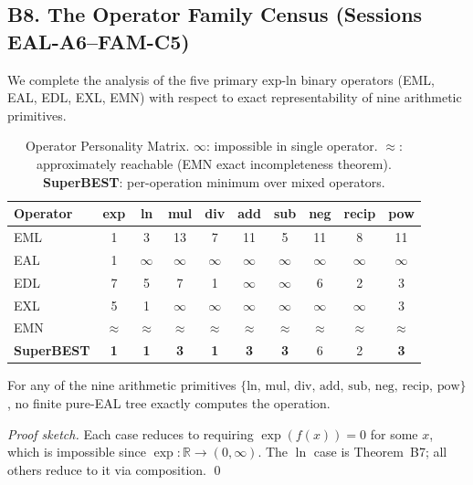 \subsection*{B8. The Operator Family Census (Sessions EAL-A6--FAM-C5)}

We complete the analysis of the five primary exp-ln binary operators
(EML, EAL, EDL, EXL, EMN) with respect to exact representability
of nine arithmetic primitives.

\begin{table}[h]
\centering
\begin{tabular}{l|ccccccccc}
\hline
Operator & exp & ln & mul & div & add & sub & neg & recip & pow \\
\hline
EML      & 1   & 3  & 13  & 7   & 11  & 5   & 11  & 8     & 11  \\
EAL      & 1   & $\infty$ & $\infty$ & $\infty$ & $\infty$ & $\infty$ & $\infty$ & $\infty$ & $\infty$ \\
EDL      & 7   & 5  & 7   & 1   & $\infty$ & $\infty$ & 6 & 2 & 3   \\
EXL      & 5   & 1  & $\infty$ & $\infty$ & $\infty$ & $\infty$ & $\infty$ & $\infty$ & 3 \\
EMN      & $\approx$ & $\approx$ & $\approx$ & $\approx$ & $\approx$ & $\approx$ & $\approx$ & $\approx$ & $\approx$ \\
\hline
\textbf{SuperBEST} & \textbf{1} & \textbf{1} & \textbf{3} & \textbf{1} & \textbf{3} & \textbf{3} & 6 & 2 & \textbf{3} \\
\hline
\end{tabular}
\caption{Operator Personality Matrix. $\infty$: impossible in single operator.
$\approx$: approximately reachable (EMN exact incompleteness theorem).
\textbf{SuperBEST}: per-operation minimum over mixed operators.}
\end{table}

\begin{theorem}
For any of the nine arithmetic primitives $\{\mathrm{ln},\, \mathrm{mul},\,
\mathrm{div},\, \mathrm{add},\, \mathrm{sub},\, \mathrm{neg},\, \mathrm{recip},\,
\mathrm{pow}\}$, no finite pure-EAL tree exactly computes the operation.
\end{theorem}

\begin{proof}[Proof sketch]
Each case reduces to requiring $\exp(f(x)) = 0$ for some $x$, which is impossible
since $\exp: \mathbb{R} \to (0,\infty)$. The $\ln$ case is Theorem~B7;
all others reduce to it via composition. \qed
\end{proof}

